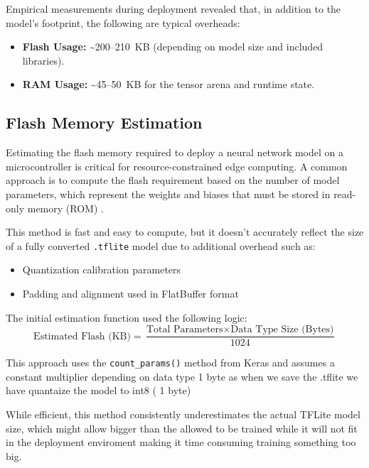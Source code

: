 Empirical measurements during deployment revealed that, in addition to the model's footprint, the following are typical overheads:

\begin{itemize}
    \item \textbf{Flash Usage:} \textasciitilde200--210~KB (depending on model size and included libraries).
    \item \textbf{RAM Usage:} \textasciitilde45--50~KB for the tensor arena and runtime state.
\end{itemize}





\clearpage

\subsection{Flash Memory Estimation}

Estimating the flash memory required to deploy a neural network model on a microcontroller is critical for resource-constrained edge computing. A common approach is to compute the flash requirement based on the number of model parameters, which represent the weights and biases that must be stored in read-only memory (ROM) \cite{pau2023tiny}.

This method is fast and easy to compute, but it doesn't accurately reflect the size of a fully converted \texttt{.tflite} model due to additional overhead such as:
\begin{itemize}
    \item Quantization calibration parameters
    \item Padding and alignment used in FlatBuffer format \cite{manor2022custom}
\end{itemize}



The initial estimation function used the following logic:
\[
\text{Estimated Flash (KB)} = \frac{\text{Total Parameters} \times \text{Data Type Size (Bytes)}}{1024}
\]

This approach uses the \texttt{count\_params()} method from Keras and assumes a constant multiplier depending on data type 1 byte as when we save the .tflite we have quantaize the model to int8 ( 1 byte)

While efficient, this method consistently underestimates the actual TFLite model size, which might allow bigger than the allowed to be trained while it will not fit in the deployment enviroment making it time consuming training something too big.

